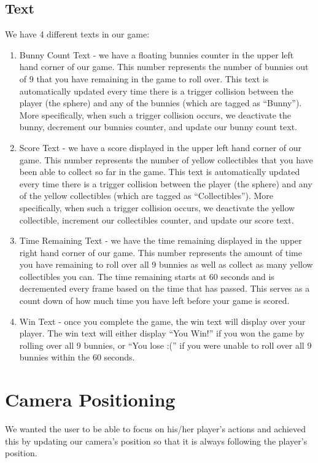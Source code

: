 \documentclass[12pt]{article}
\begin{document}
\subsection{Text}

We have 4 different texts in our game:

\begin{enumerate}
  \item Bunny Count Text - we have a floating bunnies counter in the upper left hand corner of our game. This number represents the number of bunnies out of 9 that you have remaining in the game to roll over. This text is automatically updated every time there is a trigger collision between the player (the sphere) and any of the bunnies (which are tagged as ``Bunny''). More specifically, when such a trigger collision occurs, we deactivate the bunny, decrement our bunnies counter, and update our bunny count text.
  \item Score Text - we have a score displayed in the upper left hand corner of our game. This number represents the number of yellow collectibles that you have been able to collect so far in the game. This text is automatically updated every time there is a trigger collision between the player (the sphere) and any of the yellow collectibles (which are tagged as ``Collectibles''). More specifically, when such a trigger collision occurs, we deactivate the yellow collectible, increment our collectibles counter, and update our score text.
  \item Time Remaining Text - we have the time remaining displayed in the upper right hand corner of our game. This number represents the amount of time you have remaining to roll over all 9 bunnies as well as collect as many yellow collectibles you can. The time remaining starts at 60 seconds and is decremented every frame based on the time that has passed. This serves as a count down of how much time you have left before your game is scored.
  \item Win Text - once you complete the game, the win text will display over your player. The win text will either display ``You Win!'' if you won the game by rolling over all 9 bunnies, or ``You lose :('' if you were unable to roll over all 9 bunnies within the 60 seconds.
\end{enumerate}




\section{Camera Positioning}
  We wanted the user to be able to focus on his/her player's actions and achieved this by updating our camera's position so that it is always following the player's position. 
\end{document}

